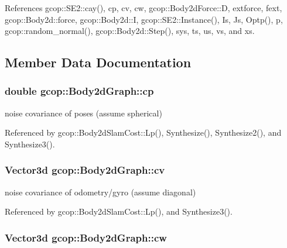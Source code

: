 \-References gcop\-::\-S\-E2\-::cay(), cp, cv, cw, gcop\-::\-Body2d\-Force\-::\-D, extforce, fext, gcop\-::\-Body2d\-::force, gcop\-::\-Body2d\-::\-I, gcop\-::\-S\-E2\-::\-Instance(), \-Is, \-Js, \-Optp(), p, gcop\-::random\-\_\-normal(), gcop\-::\-Body2d\-::\-Step(), sys, ts, us, vs, and xs.



\subsection{\-Member \-Data \-Documentation}
\subsubsection[{cp}]{\setlength{\rightskip}{0pt plus 5cm}double {\bf gcop\-::\-Body2d\-Graph\-::cp}}\label{classgcop_1_1Body2dGraph_a6783913ab4e95009dbf614fc8f0af9e7}


noise covariance of poses (assume spherical) 



\-Referenced by gcop\-::\-Body2d\-Slam\-Cost\-::\-Lp(), \-Synthesize(), \-Synthesize2(), and \-Synthesize3().

\subsubsection[{cv}]{\setlength{\rightskip}{0pt plus 5cm}\-Vector3d {\bf gcop\-::\-Body2d\-Graph\-::cv}}\label{classgcop_1_1Body2dGraph_a890f300e631cf998fc0e8f8802cc4a5a}


noise covariance of odometry/gyro (assume diagonal) 



\-Referenced by gcop\-::\-Body2d\-Slam\-Cost\-::\-Lp(), and \-Synthesize3().

\subsubsection[{cw}]{\setlength{\rightskip}{0pt plus 5cm}\-Vector3d {\bf gcop\-::\-Body2d\-Graph\-::cw}}\label{classgcop_1_1Body2dGraph_aab6e959bacfcb92840ebabf0aad05ed9}


